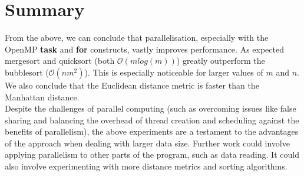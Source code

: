 \documentclass[10pt]{article}
\begin{document}
\section{Summary}
From the above, we can conclude that parallelisation, especially with the OpenMP \textbf{task} and \textbf{for} constructs, vastly improves performance. As expected mergesort and quicksort (both $\mathcal{O}(mlog(m))$) greatly outperform the bubblesort ($\mathcal{O}(nm^2)$). This is especially noticeable for larger values of $m$ and $n$. We also conclude that the Euclidean distance metric is faster than the Manhattan distance.
\\
Despite the challenges of parallel computing (such as overcoming issues like false sharing and balancing the overhead of thread creation and scheduling against the benefits of parallelism), the above experiments are a testament to the advantages of the approach when dealing with larger data size. Further work could involve applying parallelism to other parts of the program, such as data reading. It could also involve experimenting with more distance metrics and sorting algorithms.


\end{document}
